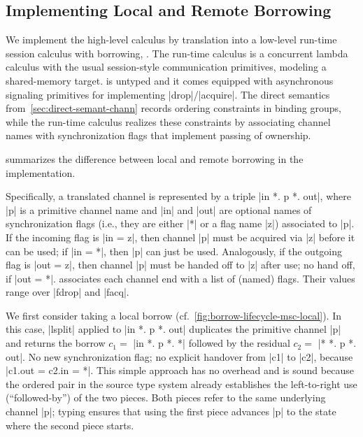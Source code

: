 \subsection{Implementing Local and Remote Borrowing}
\label{sec:impl-local-remote}

We implement the high-level calculus by translation into a low-level run-time
session calculus with borrowing, \thertcalculus. The run-time calculus is a
concurrent lambda calculus with the usual session-style communication
primitives, modeling a shared-memory target. \thertcalculus is untyped and it comes equipped with
asynchronous signaling primitives for implementing |drop|/|acquire|.  The direct
semantics from~\cref{sec:direct-semant-chann} records ordering constraints in
binding groups, while the run-time calculus realizes these constraints by associating
channel names with synchronization flags that implement passing
of ownership. 

 summarizes the difference between local
and remote borrowing in the implementation.

%


%
%

Specifically, a translated channel is represented by a triple |in *. p *. out|, where |p|
is a primitive channel name and |in| and |out| are optional names of
synchronization flags (i.e., they are
either |*| or a flag name |z|) associated to |p|. If the incoming flag is |in = z|, then channel
|p| must be acquired via |z| before it can be used; if |in = *|, then |p| can just be
used. Analogously, if the outgoing flag is |out = z|, then 
channel |p| must be handed off to |z| after use; no hand off,
if |out = *|. \thertcalculus associates each  
channel end with a list of (named) flags. Their values range over |fdrop| and
|facq|.

We first consider taking a local borrow (cf.~\cref{fig:borrow-lifecycle-msc-local}). In
this case, 
|lsplit| applied to |in *. p *. out| duplicates the primitive channel |p| and
returns the borrow $c_1=$ |in *. p *. *| followed by the residual $c_2=$ |* *. p
*. out|. 
No new synchronization flag; no explicit handover from
|c1| to |c2|, because |c1.out = c2.in = *|. This simple
approach has no overhead and is sound because the ordered pair in the source
type system already establishes the left-to-right use (``followed-by'') of
the two pieces. Both pieces refer to the same underlying
channel |p|; typing ensures that using the first piece advances |p| to
the state where the second piece starts.

